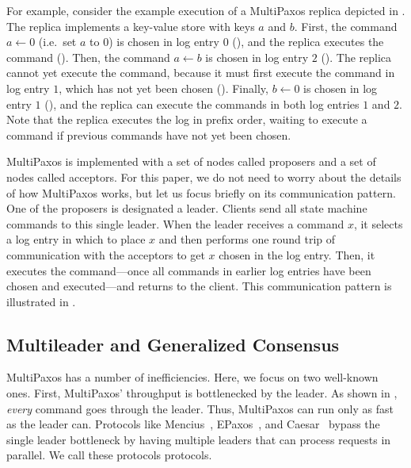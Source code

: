 For example, consider the example execution of a MultiPaxos replica depicted in
. The replica implements a key-value store
with keys $a$ and $b$. First, the command $a \gets 0$ (i.e.\ set $a$ to $0$) is
chosen in log entry $0$ (), and the replica
executes the command (). Then, the command
$a \gets b$ is chosen in log entry $2$ ().
The replica cannot yet execute the command, because it must first execute the
command in log entry $1$, which has not yet been chosen
().  Finally, $b \gets 0$ is chosen in log
entry $1$ (), and the replica can execute
the commands in both log entries $1$ and $2$. Note that the replica executes
the log in prefix order, waiting to execute a command if previous commands have
not yet been chosen.

{}

MultiPaxos is implemented with a set of nodes called proposers and a set of
nodes called acceptors. For this paper, we do not need to worry about the
details of how MultiPaxos works, but let us focus briefly on its communication
pattern. One of the proposers is designated a leader. Clients send all state
machine commands to this single leader. When the leader receives a command $x$,
it selects a log entry in which to place $x$ and then performs one round trip
of communication with the acceptors to get $x$ chosen in the log entry. Then,
it executes the command---once all commands in earlier log entries have been
chosen and executed---and returns to the client.  This communication pattern is
illustrated in .

{}

\subsection{Multileader and Generalized Consensus}
MultiPaxos has a number of inefficiencies. Here, we focus on two well-known
ones. First, MultiPaxos' throughput is bottlenecked by the leader. As shown in
, \emph{every} command goes through the leader.
Thus, MultiPaxos can run only as fast as the leader can. Protocols like
Mencius~\cite{mao2008mencius}, EPaxos~\cite{moraru2013there}, and
Caesar~\cite{arun2017speeding} bypass the single leader bottleneck by having
multiple leaders that can process requests in parallel. We call these protocols
 protocols.

